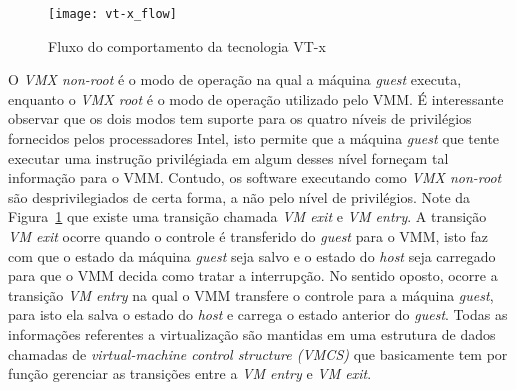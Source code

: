 \begin{figure}[!h]
  \centering
  \texttt{[image: vt-x\_flow]} 
  \caption{Fluxo do comportamento da tecnologia VT-x}
  \label{fig:vt-x_flow}
\end{figure}

O \emph{VMX non-root} é o modo de operação na qual a máquina \emph{guest}
executa, enquanto o \emph{VMX root} é o modo de operação utilizado pelo VMM. É
interessante observar que os dois modos tem suporte para os quatro níveis de
privilégios fornecidos pelos processadores Intel, isto permite que a máquina
\emph{guest} que tente executar uma instrução privilégiada em algum desses
nível forneçam tal informação para o VMM. Contudo, os software executando como
\emph{VMX non-root} são desprivilegiados de certa forma, a não pelo nível de
privilégios. Note da Figura~\ref{fig:vt-x_flow} que existe uma transição chamada
\emph{VM exit} e \emph{VM entry}. A transição \emph{VM exit} ocorre quando o
controle é transferido do \emph{guest} para o VMM, isto faz com que o estado da
máquina \emph{guest} seja salvo e o estado do \emph{host} seja carregado para
que o VMM decida como tratar a interrupção. No sentido oposto, ocorre a
transição \emph{VM entry} na qual o VMM transfere o controle para a máquina
\emph{guest}, para isto ela salva o estado do \emph{host} e carrega o estado
anterior do \emph{guest}. Todas as informações referentes a virtualização são
mantidas em uma estrutura de dados chamadas de \emph{virtual-machine control
structure (VMCS)} que basicamente tem por função gerenciar as transições entre
a \emph{VM entry} e \emph{VM exit}.

